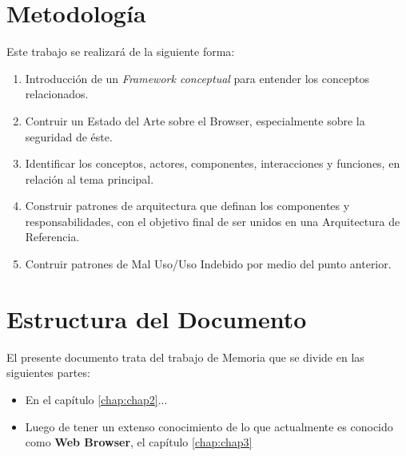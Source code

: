 \section{Metodología}
\label{chap1:Met}
Este trabajo se realizará de la siguiente forma:
\begin{enumerate}
	\item Introducción de un \textit{Framework conceptual} para entender los conceptos relacionados.
	\item Contruir un Estado del Arte sobre el Browser, especialmente sobre la seguridad de éste.
	\item Identificar los conceptos, actores, componentes, interacciones y funciones, en relación al tema principal.
	\item Construir patrones de arquitectura que definan los componentes y responsabilidades, con el objetivo final de ser unidos en una Arquitectura de Referencia.
	\item Contruir patrones de Mal Uso/Uso Indebido por medio del punto anterior.
\end{enumerate}

\section{Estructura del Documento}
\label{chap1:estruct}

El presente documento trata del trabajo de Memoria que se divide en las siguientes partes:

\begin{itemize}
	\item En el capítulo \ref{chap:chap2}... %
	\item Luego de tener un extenso conocimiento de lo que actualmente es conocido como \textbf{Web Browser}, el capítulo \ref{chap:chap3}
\end{itemize}












